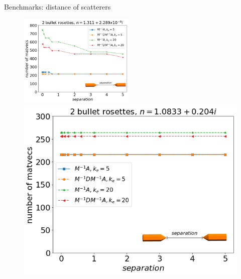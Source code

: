 \documentclass[12pt]{beamer}
\begin{document}
\begin{frame}{Benchmarks: distance of scatterers}
    \begin{figure}
	\centering
    \includegraphics[width = 0.49\textwidth]{Figures/rosettes_dist_low.png}
    \includegraphics[width = 0.49 \textwidth]{Figures/rosettes_dist_high.png}
    \end{figure}
\end{frame}
\end{document}
